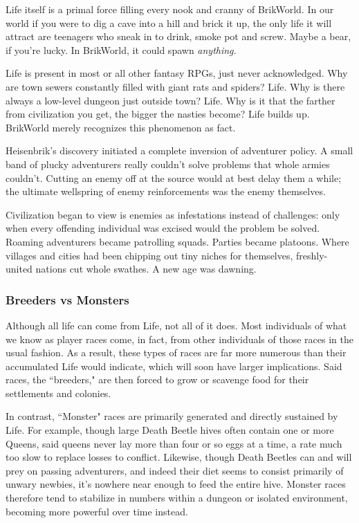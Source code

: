 \documentclass[12pt,a4paper,twocolumn]{article}
\begin{document}
Life itself is a primal force filling every nook and cranny of BrikWorld.  In our world if you were to dig a cave into a hill and brick it up, the only life it will attract are teenagers who sneak in to drink, smoke pot and screw.  Maybe a bear, if you're lucky.  In BrikWorld, it could spawn {\em anything.}  

Life is present in most or all other fantasy RPGs, just never acknowledged.  Why are town sewers constantly filled with giant rats and spiders?  Life.  Why is there always a low-level dungeon just outside town?  Life.  Why is it that the farther from civilization you get, the bigger the nasties become?  Life builds up.  BrikWorld merely recognizes this phenomenon as fact.

Heisenbrik's discovery initiated a complete inversion of adventurer policy.  A small band of plucky adventurers really couldn't solve problems that whole armies couldn't.  Cutting an enemy off at the source would at best delay them a while; the ultimate wellspring of enemy reinforcements was the enemy themselves.  

Civilization began to view is enemies as infestations instead of challenges: only when every offending individual was excised would the problem be solved.  Roaming adventurers became patrolling squads.  Parties became platoons.  Where villages and cities had been chipping out tiny niches for themselves, freshly-united nations cut whole swathes.  A new age was dawning.
\subsubsection{Breeders vs Monsters}
Although all life can come from Life, not all of it does.  Most individuals of what we know as player races come, in fact, from other individuals of those races in the usual fashion.  As a result, these types of races are far more numerous than their accumulated Life would indicate, which will soon have larger implications.  Said races, the ``breeders," are then forced to grow or scavenge food for their settlements and colonies.

In contrast, ``Monster" races are primarily generated and directly sustained by Life.  For example, though large Death Beetle hives often contain one or more Queens, said queens never lay more than four or so eggs at a time, a rate much too slow to replace losses to conflict.  Likewise, though Death Beetles can and will prey on passing adventurers, and indeed their diet seems to consist primarily of unwary newbies, it's nowhere near enough to feed the entire hive.  Monster races therefore tend to stabilize in numbers within a dungeon or isolated environment, becoming more powerful over time instead.
\end{document}

